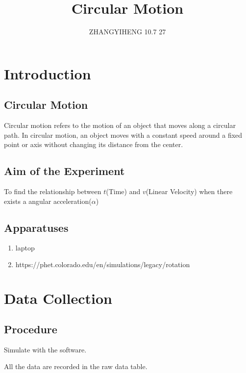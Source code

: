 \documentclass[12pt,a4paper]{article}
\author{ZHANGYIHENG 10.7 27}
\title{Circular Motion}
\date{}
\begin{document}
\setmainfont{Times New Roman}
\setsansfont{Times New Roman}
\begin{spacing}{1.25}
\maketitle
\tableofcontents
\setlength{\parindent}{4ex}
\newpage
\section{Introduction}
\subsection{Circular Motion}
Circular motion refers to the motion of an object that moves along a circular path. In circular motion, an object moves with a constant speed around a fixed point or axis without changing its distance from the center. 
\subsection{Aim of the Experiment}
To find the relationship between $ t $(Time) and $ v $(Linear Velocity) when there exists a angular acceleration($ \alpha $)
\subsection{Apparatuses}
\begin{enumerate}
    \setlength{\itemsep}{-1ex}
    \setlength{\parsep}{-1ex}
    \setlength{\topsep}{-1em}
    \item laptop
    \item https://phet.colorado.edu/en/simulations/legacy/rotation
\end{enumerate}
\section{Data Collection}
\subsection{Procedure}
Simulate with the software.\par
All the data are recorded in the raw data table.

\end{spacing}
\end{document}

